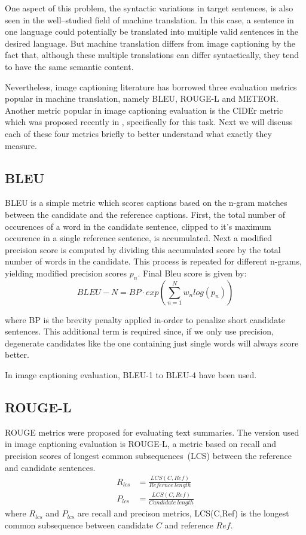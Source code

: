 One aspect of this problem, the syntactic variations in target sentences, is also
seen in the well--studied field of machine translation.
In this case, a sentence in one language could potentially be translated into
multiple valid sentences in the desired language.
But machine translation differs from image captioning by the fact that, although
these multiple translations can differ syntactically, they tend to have the same
semantic content.

Nevertheless, image captioning literature has borrowed three evaluation metrics
popular in machine translation, namely BLEU\cite{Papineni:BLEU},
ROUGE-L\cite{lin2004rouge} and METEOR\cite{denkowski-lavie:2014:Meteor}. 
Another metric popular in image captioning evaluation is the CIDEr metric which
was proposed recently in \cite{Vedantam_2015_CVPR}, specifically for this task. 
Next we will discuss each of these four metrics briefly to better understand
what exactly they measure.

\subsection*{BLEU}
BLEU is a simple metric which scores captions based on the n-gram matches
between the candidate and the reference captions.
First, the total
number of occurences of a word in the candidate sentence, clipped to it's
maximum occurence in a single reference sentence, is accumulated.
Next a modified precision score is computed by dividing this accumulated score
by the total number of words in the candidate.
This process is repeated for different n-grams, yielding modified precision
scores $p_n$. 
Final Bleu score is given by:
\begin{equation}
    BLEU-N = BP\cdot{}exp(\sum_{n=1}^{N}w_{n}log(p_n))        
\end{equation}

\noindent where BP is the brevity penalty applied in-order to penalize 
short candidate sentences.
This additional term is required since, if we only use precision, degenerate
candidates like the one containing just single words will always score better.

In image captioning evaluation, BLEU-1 to BLEU-4 have been used. 
\subsection*{ROUGE-L}
ROUGE metrics were proposed for evaluating text summaries.
The version used in image captioning evaluation is ROUGE-L, a metric based on
recall and precision scores of longest common subsequences~(LCS) between the reference
and candidate sentences.
\begin{align}
        R_{lcs} &= \frac{LCS(C,Ref)}{Refernce\ length}\\[0.75ex]
        P_{lcs} &= \frac{LCS(C,Ref)}{Candidate\ length}
\end{align}
\noindent where $R_{lcs}$ and $P_{lcs}$ are recall and precison metrics,
LCS(C,Ref) is the longest common subsequence between candidate $C$ and reference
$Ref$. 

